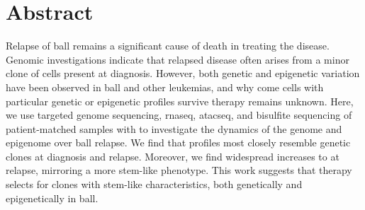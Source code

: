 \section{Abstract}

Relapse of \gls{ball} remains a significant cause of death in treating the disease.
Genomic investigations indicate that relapsed disease often arises from a minor clone of cells present at diagnosis.
However, both genetic and epigenetic variation have been observed in \gls{ball} and other leukemias, and why come cells with particular genetic or epigenetic profiles survive therapy remains unknown.
Here, we use targeted genome sequencing, \gls{rnaseq}, \gls{atacseq}, and bisulfite sequencing of patient-matched samples with  to investigate the dynamics of the genome and epigenome over \gls{ball} relapse.
We find that  profiles most closely resemble genetic clones at diagnosis and relapse.
Moreover, we find widespread increases to  at relapse, mirroring a more stem-like phenotype.
This work suggests that therapy selects for clones with stem-like characteristics, both genetically and epigenetically in \gls{ball}.
